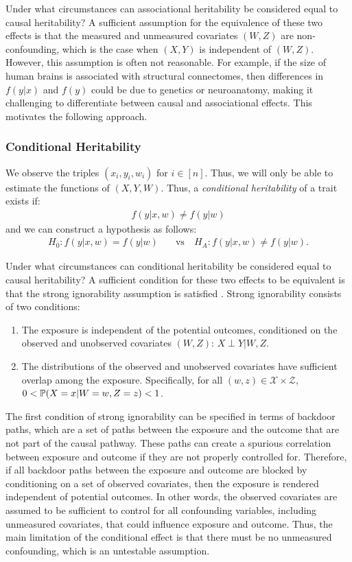 Under what circumstances can associational heritability be considered equal to causal heritability? A sufficient assumption for the equivalence of these two effects is that the measured and unmeasured covariates $(W,Z)$ are non-confounding, which is the case when $(X, Y)$ is independent of $(W, Z)$. However, this assumption is often not reasonable. For example, if the size of human brains is associated with structural connectomes, then differences in $f(y|x)$ and $f(y)$ could be due to genetics or neuroanatomy, making it challenging to differentiate between causal and associational effects. This motivates the following approach.

\subsubsection{Conditional Heritability} \label{sec:cond-effect}
We observe the triples $(x_i, y_i, w_i)$ for $i\in[n]$. Thus, we will only be able to estimate the functions of $(X, Y, W)$. Thus, a \textit{conditional heritability} of a trait exists if:%
\begin{align*} 
    f(y|x, w) \neq f(y|w)
\end{align*}
and we can construct a hypothesis as follows:
\begin{align}
    H_0: f(y|x, w) = f(y|w) \quad &\text{vs} \quad 
    H_A: f(y|x, w) \neq f(y|w).
    \label{eq:conditional-hypothesis}
\end{align}

Under what circumstances can conditional heritability be considered equal to causal heritability? A sufficient condition for these two effects to be equivalent is that the strong ignorability assumption is satisfied \cite{rosenbaum1983central}. Strong ignorability consists of two conditions:
\begin{enumerate}[leftmargin=*]
    \item The exposure is independent of the potential outcomes, conditioned on the observed and unobserved covariates $(W,Z)$: $X\perp Y|  W, Z$.
    \item The distributions of the observed and unobserved covariates have sufficient overlap among the exposure. Specifically, for all $(w, z) \in \mathcal{X} \times \mathcal{Z}$, $0 < \mathbb{P}(X=x | W=w, Z=z) < 1$.
\end{enumerate}
The first condition of strong ignorability can be specified in terms of backdoor paths, which are a set of paths between the exposure and the outcome that are not part of the causal pathway. These paths can create a spurious correlation between exposure and outcome if they are not properly controlled for. Therefore, if all backdoor paths between the exposure and outcome are blocked by conditioning on a set of observed covariates, then the exposure is rendered independent of potential outcomes. In other words, the observed covariates are assumed to be sufficient to control for all confounding variables, including unmeasured covariates,  that could influence exposure and outcome. Thus, the main limitation of the conditional effect is that there must be no unmeasured confounding, which is an untestable assumption.


